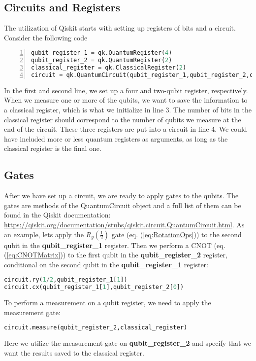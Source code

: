 \subsection{Circuits and Registers}
\label{sec:CircuitsAndRegisters}
The utilization of Qiskit starts with setting up registers of bits and a circuit. Consider the following code
\begin{lstlisting}[language=Python,numbers=left]
qubit_register_1 = qk.QuantumRegister(4)
qubit_register_2 = qk.QuantumRegister(2)
classical_register = qk.ClassicalRegister(2)
circuit = qk.QuantumCircuit(qubit_register_1,qubit_register_2,classical_register)
\end{lstlisting}
In the first and second line, we set up a four and two-qubit register, respectively. When we measure one or more of the qubits, we want to save the information to a classical register, which is what we initialize in line 3. The number of bits in the classical register should correspond to the number of qubits we measure at the end of the circuit. These three registers are put into a circuit in line 4. We could have included more or less quantum registers as arguments, as long as the classical register is the final one.

\subsection{Gates}
\label{subsec:QiskitGates}
After we have set up a circuit, we are ready to apply gates to the qubits. The gates are methods of the QuantumCircuit object and a full list of them can be found in the Qiskit documentation: \url{https://qiskit.org/documentation/stubs/qiskit.circuit.QuantumCircuit.html}.
As an example, lets apply the $R_y(\frac{1}{2})$ gate (eq. (\ref{eq:RotationOps})) to the second qubit in the \textbf{qubit\_register\_1} register. Then we perform a CNOT (eq. (\ref{eq:CNOTMatrix})) to the first qubit in the \textbf{qubit\_register\_2} register, conditional on the second qubit in the \textbf{qubit\_register\_1} register:

\begin{lstlisting}[language=Python,numbers=none]
circuit.ry(1/2,qubit_register_1[1])
circuit.cx(qubit_register_1[1],qubit_register_2[0])
\end{lstlisting}

To perform a measurement on a qubit register, we need to apply the measurement gate:

\begin{lstlisting}[language=Python,numbers=none]
circuit.measure(qubit_register_2,classical_register)
\end{lstlisting}
Here we utilize the measurement gate on \textbf{qubit\_register\_2} and specify that we want the results saved to the classical register.

